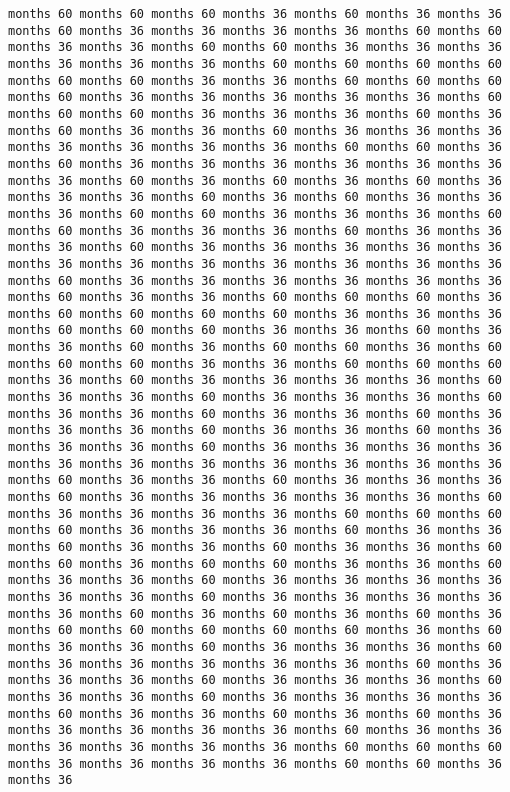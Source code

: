 \documentclass[11pt]{article}
\begin{document}
\begin{Verbatim}[commandchars=\\\{\}, frame=single, framerule=2mm, rulecolor=\color{outerrorbackground}]
months 60 months 60 months 60 months 36 months 60 months 36 months 36 months 60 months 36 months 36 months 36 months 36 months 60 months 60 months 36 months 36 months 60 months 60 months 36 months 36 months 36 months 36 months 36 months 36 months 60 months 60 months 60 months 60 months 60 months 60 months 36 months 36 months 60 months 60 months 60 months 60 months 36 months 36 months 36 months 36 months 36 months 60 months 60 months 60 months 36 months 36 months 36 months 60 months 36 months 60 months 36 months 36 months 60 months 36 months 36 months 36 months 36 months 36 months 36 months 36 months 60 months 60 months 36 months 60 months 36 months 36 months 36 months 36 months 36 months 36 months 36 months 60 months 36 months 60 months 36 months 60 months 36 months 36 months 36 months 60 months 36 months 60 months 36 months 36 months 36 months 60 months 60 months 36 months 36 months 36 months 60 months 60 months 36 months 36 months 36 months 60 months 36 months 36 months 36 months 60 months 36 months 36 months 36 months 36 months 36 months 36 months 36 months 36 months 36 months 36 months 36 months 36 months 60 months 36 months 36 months 36 months 36 months 36 months 36 months 60 months 36 months 36 months 60 months 60 months 60 months 36 months 60 months 60 months 60 months 60 months 36 months 36 months 36 months 60 months 60 months 60 months 36 months 36 months 60 months 36 months 36 months 60 months 36 months 60 months 60 months 36 months 60 months 60 months 60 months 36 months 36 months 60 months 60 months 60 months 36 months 60 months 36 months 36 months 36 months 36 months 60 months 36 months 36 months 60 months 36 months 36 months 36 months 60 months 36 months 36 months 60 months 36 months 36 months 60 months 36 months 36 months 36 months 60 months 36 months 36 months 60 months 36 months 36 months 36 months 60 months 36 months 36 months 36 months 36 months 36 months 36 months 36 months 36 months 36 months 36 months 36 months 60 months 36 months 36 months 60 months 36 months 36 months 36 months 60 months 36 months 36 months 36 months 36 months 36 months 60 months 36 months 36 months 36 months 36 months 60 months 60 months 60 months 60 months 36 months 36 months 36 months 60 months 36 months 36 months 60 months 36 months 36 months 60 months 36 months 36 months 60 months 60 months 36 months 60 months 60 months 36 months 36 months 60 months 36 months 36 months 60 months 36 months 36 months 36 months 36 months 36 months 36 months 60 months 36 months 36 months 36 months 36 months 36 months 60 months 36 months 60 months 36 months 60 months 36 months 60 months 60 months 60 months 60 months 60 months 36 months 60 months 36 months 36 months 60 months 36 months 36 months 36 months 60 months 36 months 36 months 36 months 36 months 36 months 60 months 36 months 36 months 36 months 60 months 36 months 36 months 36 months 60 months 36 months 36 months 60 months 36 months 36 months 36 months 36 months 60 months 36 months 36 months 60 months 36 months 60 months 36 months 36 months 36 months 36 months 36 months 60 months 36 months 36 months 36 months 36 months 36 months 36 months 60 months 60 months 60 months 36 months 36 months 36 months 36 months 60 months 60 months 36 months 36 
\end{Verbatim}
\end{document}
